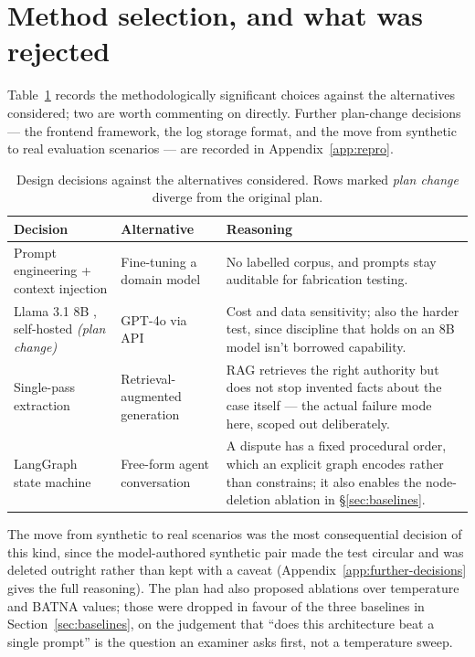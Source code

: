 \section{Method selection, and what was rejected}
\label{sec:alternatives}

Table~\ref{tab:alternatives} records the methodologically significant
choices against the alternatives considered; two are worth commenting on
directly. Further plan-change decisions --- the frontend framework, the log
storage format, and the move from synthetic to real evaluation scenarios ---
are recorded in Appendix~\ref{app:repro}.

\begin{table}[htbp]
\centering
\footnotesize
\caption[Design alternatives]{Design decisions against the alternatives
considered. Rows marked \emph{plan change} diverge from the original plan.}
\label{tab:alternatives}
\begin{tabularx}{\textwidth}{@{}>{\raggedright\arraybackslash}p{2.9cm}>{\raggedright\arraybackslash}p{3.0cm}X@{}}
\toprule
\textbf{Decision} & \textbf{Alternative} & \textbf{Reasoning} \\
\midrule
Prompt engineering + context injection & Fine-tuning a domain model &
 No labelled corpus, and prompts stay auditable for fabrication testing. \\
Llama 3.1 8B \cite{grattafiori2024llama}, self-hosted \emph{(plan change)} & GPT-4o via API &
 Cost and data sensitivity; also the harder test, since discipline that
 holds on an 8B model isn't borrowed capability. \\
Single-pass extraction & Retrieval-augmented generation &
 RAG \cite{lewis2020rag} retrieves the right authority but does not stop
 invented facts about the case itself --- the actual failure mode here,
 scoped out deliberately. \\
LangGraph state machine & Free-form agent conversation &
 A dispute has a fixed procedural order, which an explicit graph encodes
 rather than constrains; it also enables the node-deletion ablation in
 \S\ref{sec:baselines}. \\
\bottomrule
\end{tabularx}
\end{table}

The move from synthetic to real scenarios was the most consequential
decision of this kind, since the model-authored synthetic pair made the
test circular and was deleted outright rather than kept with a caveat
(Appendix~\ref{app:further-decisions} gives the full reasoning). The plan
had also proposed ablations over temperature and BATNA values; those were
dropped in favour of the three baselines in Section~\ref{sec:baselines}, on
the judgement that ``does this architecture beat a single prompt'' is the
question an examiner asks first, not a temperature sweep.

